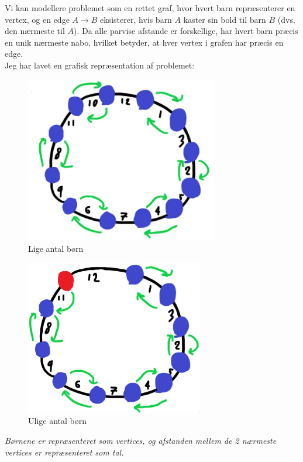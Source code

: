 \documentclass[a4paper,12pt]{article}
\begin{document}
Vi kan modellere problemet som en rettet graf, hvor hvert barn repræsenterer en vertex, og en edge \( A \to B \) eksisterer, hvis barn \( A \) kaster sin bold til barn \( B \) (dvs. den nærmeste til \( A \)). Da alle parvise afstande er forskellige, har hvert barn præcis en unik nærmeste nabo, hvilket betyder, at hver vertex i grafen har præcis en edge.\\
Jeg har lavet en grafisk repræsentation af problemet:

\begin{figure}[H]
    \centering
    \includegraphics[width=0.75\textwidth]{even.jpg}
    \caption{Lige antal børn}
\end{figure}

\begin{figure}[H]
    \centering
    \includegraphics[width=0.69\textwidth]{odd.jpg}
    \caption{Ulige antal børn}
\end{figure}
\begin{center}
    \textit{Børnene er repræsenteret som vertices, og afstanden mellem de 2 nærmeste vertices er repræsenteret som tal.}
\end{center}
\n
\end{document}
